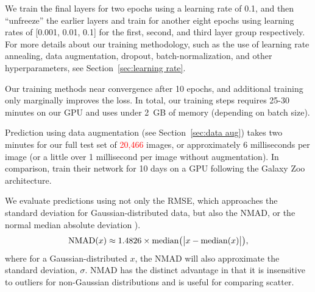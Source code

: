 \documentclass[fleqn,usenatbib]{mnras}
\newcommand{\editorial}[1]{\textcolor{red}{#1}}
\begin{document}
We train the final layers for two epochs using a learning rate of 0.1, and then ``unfreeze'' the earlier layers and train for another eight epochs using learning rates of [0.001, 0.01, 0.1] for the first, second, and third layer group respectively. For more details about our training methodology, such as the use of learning rate annealing, data augmentation, dropout, batch-normalization, and other hyperparameters, see Section~\ref{sec:learning rate}.

Our training methods near convergence after 10 epochs, and additional training only marginally improves the loss. In total, our training steps requires 25-30 minutes on our GPU and uses under 2~GB of memory (depending on batch size).

Prediction using data augmentation (see Section~\ref{sec:data aug}) takes two minutes for our full test set of \editorial{20,466} images, or approximately 6 milliseconds per image (or a little over 1 millisecond per image without augmentation). In comparison, \cite{Huertas-Company2015} train their network for 10 days on a GPU following the Galaxy Zoo architecture.


We evaluate predictions using not only the RMSE, which approaches the standard deviation for Gaussian-distributed data, but also the NMAD, or the normal median absolute deviation ).
\begin{equation}
{\rm NMAD}(x) \approx 1.4826 \times {\rm median} \big (\big|x - {\rm median }(x) \big|\big ),
\end{equation}
where for a Gaussian-distributed $x$, the NMAD will also approximate the standard deviation, $\sigma$.
NMAD has the distinct advantage in that it is insensitive to outliers for non-Gaussian distributions and is useful for comparing scatter.

\end{document}
